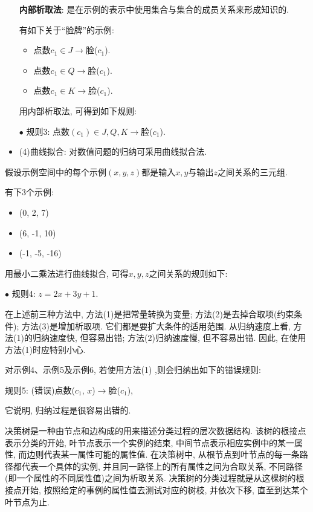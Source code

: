 \begin{itemize}
\textbf{内部析取法}: 是在示例的表示中使用集合与集合的成员关系来形成知识的.

\begin{example}
有如下关于“脸牌”的示例:
\begin{itemize}
\item 点数$c_1\in {J}\rightarrow$脸($c_1$).
\item 点数$c_1\in {Q}\rightarrow$脸($c_1$).
\item 点数$c_1\in {K}\rightarrow$脸($c_1$).
\end{itemize}

用内部析取法, 可得到如下规则:

$\bullet$ 规则3: 点数$(c_1)\in {J, Q, K}\rightarrow$脸($c_1$).
\end{example}
\item (4)曲线拟合: 对数值问题的归纳可采用曲线拟合法.
\end{itemize}
假设示例空间中的每个示例$(x, y, z)$都是输入$x, y$与输出$z$之间关系的三元组.
\begin{example}
有下3个示例:
\begin{itemize}
\item (0, 2, 7)
\item (6, -1, 10)
\item (-1, -5, -16)
\end{itemize}

用最小二乘法进行曲线拟合, 可得$x, y, z$之间关系的规则如下:

$\bullet$ 规则4: $z=2x+3y+1$.
\end{example}
\begin{remark}
在上述前三种方法中, 方法(1)是把常量转换为变量; 方法(2)是去掉合取项(约束条件); 方法(3)是增加析取项. 它们都是要扩大条件的适用范围.
从归纳速度上看, 方法(1)的归纳速度快, 但容易出错; 方法(2)归纳速度慢, 但不容易出错. 因此, 在使用方法(1)时应特别小心.

\begin{example}
对示例4、示例5及示例6, 若使用方法(1) ,则会归纳出如下的错误规则:

规则5: (错误)点数($c_1$, $x$)$\rightarrow$脸($c_1$),

它说明, 归纳过程是很容易出错的.
\end{example}
\end{remark}

决策树是一种由节点和边构成的用来描述分类过程的层次数据结构. 该树的根接点表示分类的开始, 叶节点表示一个实例的结束, 中间节点表示相应实例中的某一属性, 而边则代表某一属性可能的属性值.
在决策树中, 从根节点到叶节点的每一条路径都代表一个具体的实例, 并且同一路径上的所有属性之间为合取关系, 不同路径(即一个属性的不同属性值)之间为析取关系.
决策树的分类过程就是从这棵树的根接点开始, 按照给定的事例的属性值去测试对应的树枝, 并依次下移, 直至到达某个叶节点为止.

